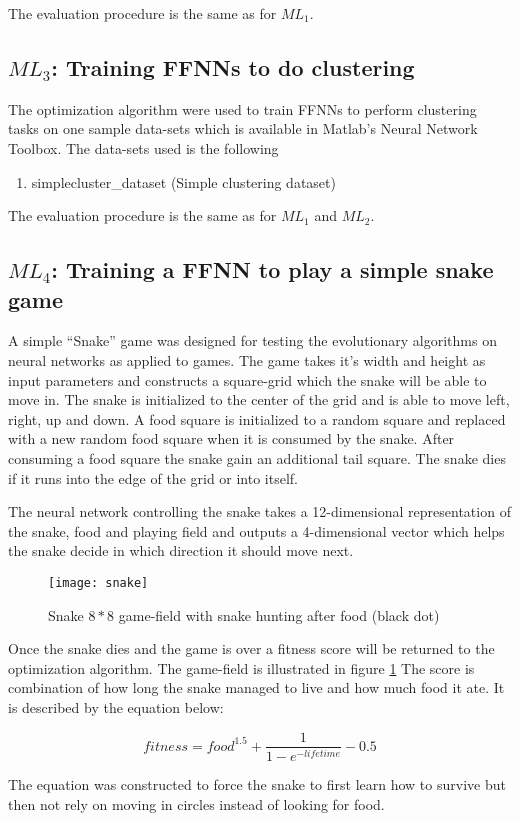 The evaluation procedure is the same as for $ML_{1}$.

\subsection{$ML_{3}$: Training FFNNs to do clustering}

The optimization algorithm were used to train FFNNs to perform clustering tasks on one sample data-sets which is available in Matlab's Neural Network Toolbox. The data-sets used is the following

\begin{enumerate}
  \item simplecluster\_dataset (Simple clustering dataset)
\end{enumerate}

The evaluation procedure is the same as for $ML_{1}$ and $ML_{2}$.

\subsection{$ML_{4}$: Training a FFNN to play a simple snake game}

A simple ``Snake'' game was designed for testing the evolutionary algorithms on neural networks as applied to games. The game takes it's width and height as input parameters and constructs a square-grid which the snake will be able to move in. The snake is initialized to the center of the grid and is able to move left, right, up and down. A food square is initialized to a random square and replaced with a new random food square when it is consumed by the snake. After consuming a food square the snake gain an additional tail square. The snake dies if it runs into the edge of the grid or into itself.

The neural network controlling the snake takes a 12-dimensional representation of the snake, food and playing field and outputs a 4-dimensional vector which helps the snake decide in which direction it should move next.

\begin{figure}[H]
  \centering
  \texttt{[image: snake]}
  \caption{Snake $8*8$ game-field with snake hunting after food (black dot)}
  \label{snake}
\end{figure}

Once the snake dies and the game is over a fitness score will be returned to the optimization algorithm. The game-field is illustrated in figure \ref{snake} The score is combination of how long the snake managed to live and how much food it ate. It is described by the equation below:

\begin{equation}
  fitness = food^{1.5} +  \frac{1}{1-e^{-lifetime}}  - 0.5
\end{equation}

The equation was constructed to force the snake to first learn how to survive but then not rely on moving in circles instead of looking for food.
